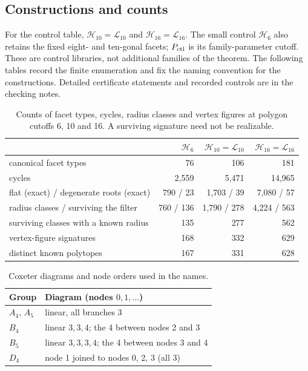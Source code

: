 \documentclass[11pt]{article}
\theoremstyle{definition}
\theoremstyle{remark}
\begin{document}
\begin{appendices}
\section{Constructions and counts}\label{app:names}
For the control table, $\mathcal H_{10}=\mathcal L_{10}$ and $\mathcal H_{16}=\mathcal L_{16}$. The small control $\mathcal H_6$ also retains the fixed eight- and ten-gonal facets; $P_{\rm ctl}$ is its family-parameter cutoff. These are control libraries, not additional families of the theorem.
The following tables record the finite enumeration and fix the naming convention for the constructions. Detailed certificate statements and recorded controls are in the checking notes.\par
\begin{table}[ht]
\centering\small
\caption{Counts of facet types, cycles, radius classes and vertex figures at polygon cutoffs 6, 10 and 16. A surviving signature need not be realizable.}
\label{tab:counts}
\begin{tabular}{@{}lrrr@{}}
\toprule
 & $\mathcal H_6$ & $\mathcal H_{10}=\mathcal L_{10}$ & $\mathcal H_{16}=\mathcal L_{16}$\\
\midrule
canonical facet types & 76 & 106 & 181\\
cycles & 2,559 & 5,471 & 14,965\\
\quad flat (exact) / degenerate roots (exact) & 790 / 23 & 1,703 / 39 & 7,080 / 57\\
radius classes / surviving the filter & 760 / 136 & 1,790 / 278 & 4,224 / 563\\
surviving classes with a known radius & 135 & 277 & 562\\
vertex-figure signatures & 168 & 332 & 629\\
distinct known polytopes & 167 & 331 & 628\\
\bottomrule
\end{tabular}
\end{table}
\begin{table}[ht]
\centering\small
\caption{Coxeter diagrams and node orders used in the names.}\label{tab:names}
\begin{tabular}{@{}ll@{}}
\toprule
Group & Diagram (nodes $0,1,\dots$)\\
\midrule
$A_4$, $A_5$ & linear, all branches 3\\
$B_4$ & linear $3,3,4$; the 4 between nodes 2 and 3\\
$B_5$ & linear $3,3,3,4$; the 4 between nodes 3 and 4\\
$D_4$ & node 1 joined to nodes 0, 2, 3 (all 3)\\

\end{tabular}
\end{table}
\end{appendices}
\end{document}
